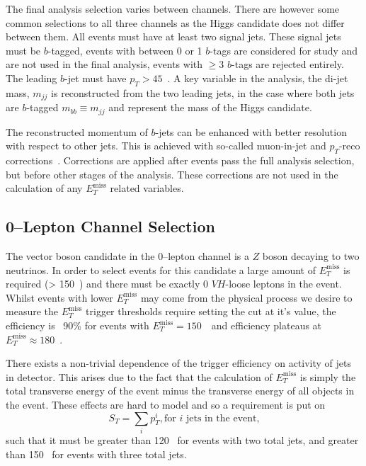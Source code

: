 The final analysis selection varies between channels. There are however some
common selections to all three channels as the Higgs candidate does not differ
between them. All events must have at least two signal jets. These signal jets
must be $b$-tagged, events with between 0 or 1 $b$-tags are considered for study
and are not used in the final analysis, events with $\ge3$ $b$-tags are rejected
entirely. The leading $b$-jet must have $p_T > 45$~\GeV. A key variable in the
analysis, the di-jet mass, $m_{jj}$ is reconstructed from the two leading jets,
in the case where both jets are $b$-tagged $m_{bb} \equiv m_{jj}$ and represent
the mass of the Higgs candidate.

The reconstructed momentum of $b$-jets can be enhanced with better resolution
with respect to other jets. This is achieved with so-called muon-in-jet and
$p_T$-reco corrections~\cite{VHObjectNote2019}. Corrections are applied after
events pass the full analysis selection, but before other stages of the
analysis. These corrections are not used in the calculation of any
$E_T^{\text{miss}}$ related variables.

\subsection{0--Lepton Channel Selection}
\label{sec:0lep-selection}

The vector boson candidate in the 0--lepton channel is a $Z$ boson decaying to
two neutrinos. In order to select events for this candidate a large amount of
$E_T^{\text{miss}}$ is required (> 150~\GeV) and there must be exactly 0
$VH$-loose leptons in the event. Whilst events with lower $E_T^{\text{miss}}$
may come from the physical process we desire to measure the $E_T^{\text{miss}}$
trigger thresholds require setting the cut at it's value, the efficiency is
~90\% for events with $E_T^{\text{miss}} = 150$~\GeV\ and efficiency plateaus at
$E_T^{\text{miss}} \approx 180$~\GeV.

There exists a non-trivial dependence of the trigger efficiency on activity of
jets in detector. This arises due to the fact that the calculation of
$E_T^{\text{miss}}$ is simply the total transverse energy of the event minus the
transverse energy of all objects in the event. These effects are hard to model
and so a requirement is put on
\begin{equation}
  S_T = \sum_i p_T^i, \text{for } i \text{ jets in the event,}
\end{equation}
such that it must be greater than 120 \GeV\ for events with two total jets, and
greater than 150 \GeV\ for events with three total jets.

